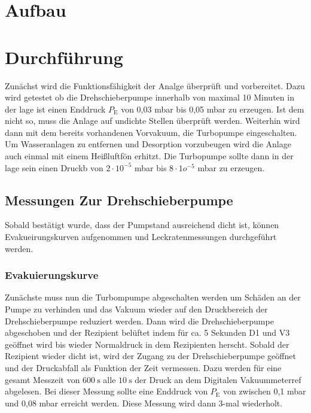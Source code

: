 \section{Aufbau}

\section{Durchführung}
	Zunächst wird die Funktionsfähigkeit der Analge überprüft und vorbereitet. 
	Dazu wird getestet ob die Drehschieberpumpe innerhalb von maximal 10 Minuten in der lage ist einen Enddruck $P_\text{E}$ von 0,03 mbar bis 0,05 mbar zu erzeugen. 
	Ist dem nicht so, muss die Anlage auf undichte Stellen überprüft werden.
	Weiterhin wird dann mit dem bereits vorhandenen Vorvakuum, die Turbopumpe eingeschalten. 
	Um Wasseranlagen zu entfernen und Desorption vorzubeugen wird die Anlage auch einmal mit einem Heißluftfön erhitzt.
	Die Turbopumpe sollte dann in der lage sein einen Druckb von $2 \cdot 10^{-5}$ mbar bis $8 \cdot 1o^{-5}$ mbar zu erzeugen.

	\subsection{Messungen Zur Drehschieberpumpe}

		Sobald bestätigt wurde, dass der Pumpstand ausreichend dicht ist, können Evakueirungskurven aufgenommen und Leckratenmessungen durchgeführt werden.

		\subsubsection{Evakuierungskurve}

			Zunächste muss nun die Turbompumpe abgeschalten werden um Schäden an der Pumpe zu verhinden und das Vakuum wieder auf den Druckbereich der Drehschieberpumpe reduziert werden.
			Dann wird die Drehschieberpumpe abgeschoben und der Rezipient belüftet indem für ca. 5 Sekunden D1 und V3 geöffnet wird bis wieder Normaldruck in dem Rezipienten herscht. 
			Sobald der Rezipient wieder dicht ist, wird der Zugang zu der Drehschieberpumpe geöffnet und der Druckabfall als Funktion der Zeit vermessen. 
			Dazu werden für eine gesamt Messzeit von $\SI{600}{\second}$ alle $\SI{10}{\second}$ der Druck an dem Digitalen Vakuummeter{ref} abgelesen.
			Bei dieser Messung sollte eine Enddruck von $P_\text{E}$ von zwischen 0,1 mbar und 0,08 mbar erreicht werden.
			Diese Messung wird dann 3-mal wiederholt.

